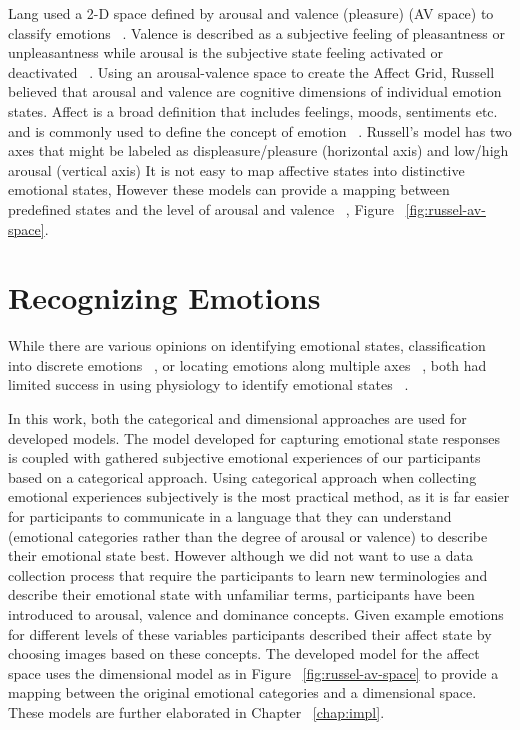 Lang used a 2-D space defined by arousal and valence (pleasure) (AV space) to classify emotions ~\cite{lang1995emotion}. Valence is described as a subjective feeling of pleasantness or unpleasantness while arousal is the subjective state feeling activated or deactivated ~\cite{barrett1998discrete}. Using an arousal-valence space to create the Affect Grid, Russell believed that arousal and valence are cognitive dimensions of individual emotion states. Affect is a broad definition that includes feelings, moods, sentiments etc. and is commonly used to define the concept of emotion ~\cite{picard2003affective}. Russell's model has two axes that might be labeled as displeasure/pleasure (horizontal axis) and low/high arousal (vertical axis) It is not easy to map affective states into distinctive emotional states, However these models can provide a mapping between predefined states and the level of arousal and valence ~\cite{zagalo2004story}, Figure ~\ref{fig:russel-av-space}.

\section{Recognizing Emotions}

While there are various opinions on identifying emotional states, classification into discrete emotions ~\cite{dalgleish1999handbook}, or locating emotions along multiple axes ~\cite{russell1989affect, lang1995emotion}, both had limited success in using physiology to identify emotional states ~\cite{cacioppo2000psychophysiology}.

In this work, both the categorical and dimensional approaches are used for developed models. The model developed for capturing emotional state responses is coupled with gathered subjective emotional experiences of our participants based on a categorical approach. Using categorical approach when collecting emotional experiences subjectively is the most practical method, as it is far easier for participants to communicate in a language that they can understand (emotional categories rather than the degree of arousal or valence) to describe their emotional state best. However although we did not want to use a data collection process that require the participants to learn new terminologies and describe their emotional state with unfamiliar terms, participants have been introduced to arousal, valence and dominance concepts. Given example emotions for different levels of these variables participants described their affect state by choosing images based on these concepts. The developed model for the affect space uses the dimensional model as in Figure ~\ref{fig:russel-av-space} to provide a mapping between the original emotional categories and a dimensional space. These models are further elaborated in Chapter ~\ref{chap:impl}.

